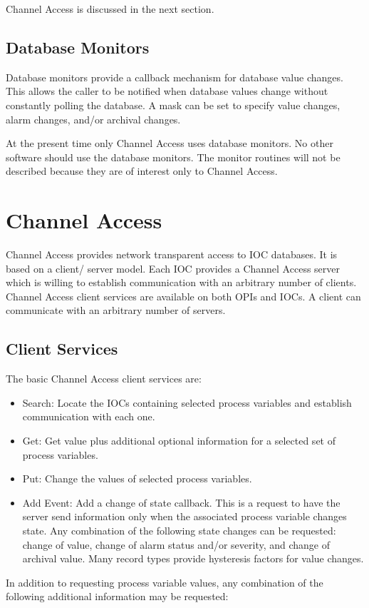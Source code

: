 Channel Access is discussed in the next section.

\subsection{Database Monitors}

Database monitors  provide a callback mechanism for database value changes. This allows the caller to be notified when 
database values change without constantly polling the database. A mask can be set to specify value changes, alarm  
changes, and/or archival changes. 

At the present time only Channel Access uses database monitors. No other software should use the database monitors.  
The monitor routines will not be described because they are of interest only to Channel Access.

\section{Channel Access}

Channel Access provides network transparent access to IOC databases. It is based on a client/ server model. Each IOC 
provides a Channel Access server which is willing to establish communication with an arbitrary number of clients. 
Channel Access client services are available on both OPIs and IOCs. A client can communicate with an arbitrary number 
of servers.

\subsection{Client Services}

The basic Channel Access client services are:

\begin{itemize}\item Search:  Locate the IOCs containing selected process variables and establish communication with each one.

\item Get:  Get value plus additional optional information for a selected set of process variables.

\item Put:  Change the values of selected process variables.

\item Add Event: Add a change of state callback. This is a request to have the server send information only when the 
associated process variable changes state. Any combination of the following state changes can be requested: 
change of value, change of alarm status and/or severity, and change of archival value. Many record types provide 
hysteresis factors for value changes.

\end{itemize}In addition to requesting process variable values, any combination of the following additional information may be 
requested:


